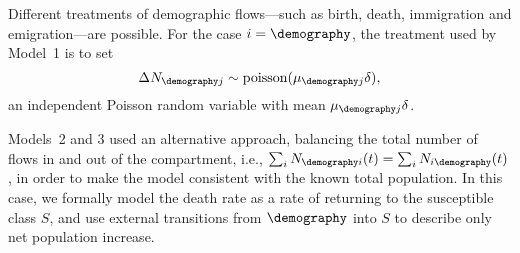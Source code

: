Different treatments of demographic flows---such as birth, death, immigration and emigration---are possible.
For the case $i=\demography$, the treatment used by Model~1 is to set
\begin{equation}
\label{eq:numerics6}
\Delta N_{\demography j} \sim \mathrm{poisson}( \mu_{\demography j} \delta),
\end{equation}
an independent Poisson random variable with mean $\mu_{\demography j} \delta$.

Models~2 and 3 used an alternative approach, balancing the total number of flows in and out of the compartment, i.e., $\sum_{i}N_{\demography i}(t) = \sum_{i}N_{i \demography}(t)$, in order to make the model consistent with the known total population.
In this case, we formally model the death rate as a rate of returning to the susceptible class $S$, and use external transitions from $\demography$ into $S$ to describe only net population increase.
